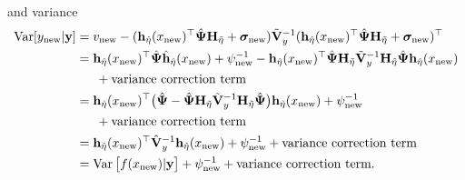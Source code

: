and variance
\begin{align*}
  \operatorname{Var}[y_{\text{new}}|{\mathbf y}] 
  &= v_{\text{new}} - ({\mathbf h}_{\hat\eta}(x_{\text{new}})^\top\hat{{\bm\Psi}}{\mathbf H}_{\tilde\eta} + {\bm\sigma}_{\text{new}})\tilde{{\mathbf V}}_y^{-1}({\mathbf h}_{\hat\eta}(x_{\text{new}})^\top\hat{{\bm\Psi}}{\mathbf H}_{\tilde\eta} + {\bm\sigma}_{\text{new}})^\top \\
  &= {\mathbf h}_{\hat\eta}(x_{\text{new}})^\top \hat{{\bm\Psi}}\hat {{\mathbf h}}_{\hat\eta}(x_{\text{new}}) + \psi^{-1}_{\text{new}} - {\mathbf h}_{\hat\eta}(x_{\text{new}})^\top\hat{{\bm\Psi}}{\mathbf H}_{\tilde\eta}\tilde{{\mathbf V}}_y^{-1}{\mathbf H}_{\tilde\eta}\hat{{\bm\Psi}}{\mathbf h}_{\hat\eta}(x_{\text{new}}) \\
  &\phantom{==}+ \text{variance correction term} \\
  &= {\mathbf h}_{\hat\eta}(x_{\text{new}})^\top 
  \big(
  \hat{{\bm\Psi}} - \hat{{\bm\Psi}}{\mathbf H}_{\tilde\eta}\tilde{{\mathbf V}}_y^{-1}{\mathbf H}_{\tilde\eta}\hat{{\bm\Psi}}
  \big)
  {\mathbf h}_{\hat\eta}(x_{\text{new}}) + \psi^{-1}_{\text{new}} \\
  &\phantom{==} + \text{variance correction term} \\
  &= {\mathbf h}_{\hat\eta}(x_{\text{new}})^\top \hat{{\mathbf V}}_y^{-1}{\mathbf h}_{\hat\eta}(x_{\text{new}}) + \psi^{-1}_{\text{new}} + \text{variance correction term} \\
  &= \operatorname{Var}\big[f(x_{\text{new}})|{\mathbf y}\big] + \psi^{-1}_{\text{new}} + \text{variance correction term}.
\end{align*}